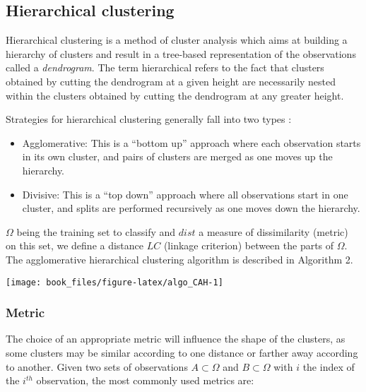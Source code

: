 \documentclass[]{book}
\begin{document}
\hypertarget{CAH}{%
\subsection{Hierarchical clustering}\label{CAH}}

Hierarchical clustering is a method of cluster analysis which aims at
building a hierarchy of clusters and result in a tree-based
representation of the observations called a \emph{dendrogram}. The term
hierarchical refers to the fact that clusters obtained by cutting the
dendrogram at a given height are necessarily nested within the clusters
obtained by cutting the dendrogram at any greater height.

Strategies for hierarchical clustering generally fall into two types
\citep{rokach2005clustering}:

\begin{itemize}
\item
  Agglomerative: This is a ``bottom up'' approach where each observation
  starts in its own cluster, and pairs of clusters are merged as one
  moves up the hierarchy.
\item
  Divisive: This is a ``top down'' approach where all observations start
  in one cluster, and splits are performed recursively as one moves
  down the hierarchy.
\end{itemize}

\(\Omega\) being the training set to classify and \(dist\) a measure of
dissimilarity (metric) on this set, we define a distance \(LC\) (linkage
criterion) between the parts of \(\Omega\). The agglomerative hierarchical
clustering algorithm is described in Algorithm 2.

\begin{center}\texttt{[image: book\_files/figure-latex/algo\_CAH-1]} \end{center}

\hypertarget{metric}{%
\subsubsection*{Metric}\label{metric}}

The choice of an appropriate metric will influence the shape of the
clusters, as some clusters may be similar according to one distance or
farther away according to another. Given two sets of observations
\(A \subset \Omega\) and \(B \subset \Omega\) with \(i\) the index of the
\(i^{th}\) observation, the most commonly used metrics are:
\end{document}
